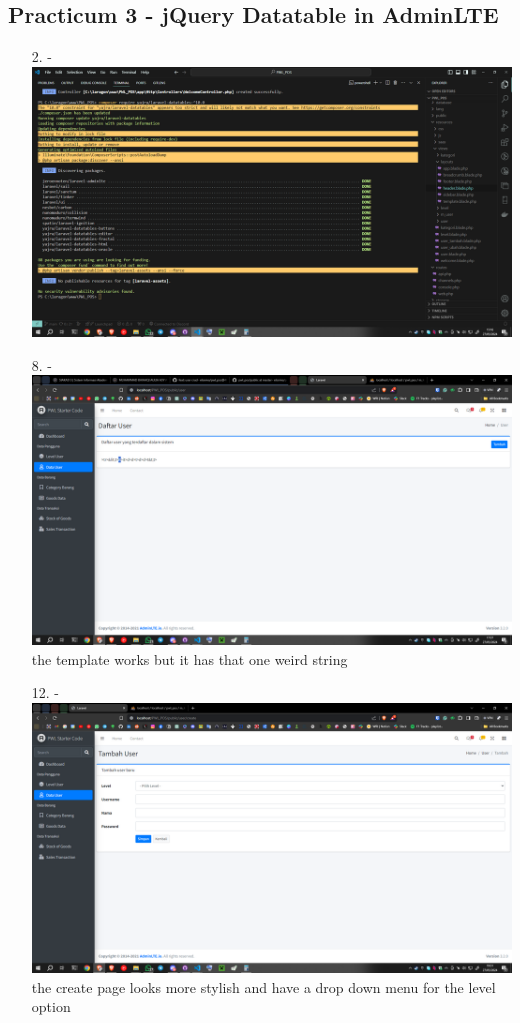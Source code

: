 \documentclass[12pt,titlepage]{article}
\begin{document}
\subsection*{Practicum 3 - jQuery Datatable in AdminLTE}
\begin{enumerate}
    \item[2.] - \\ \includegraphics[width=.9\textwidth]{images/figures/Screenshot (461).png}
    \item[8.] - \\ \includegraphics[width=.9\textwidth]{images/figures/Screenshot (462).png} \\ the template works but it has that one weird string
    \newpage
    \item[12.] - \\ \includegraphics[width=.9\textwidth]{images/figures/Screenshot (463).png} \\ the create page looks more stylish and have a drop down menu for the level option

\end{enumerate}
\end{document}
